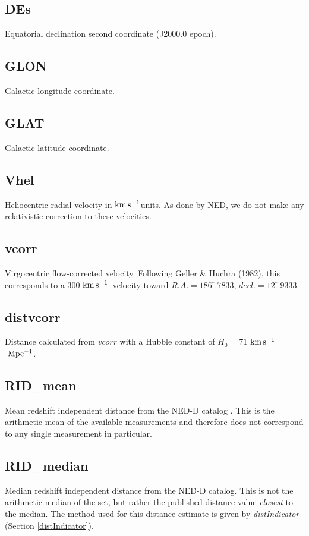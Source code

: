 \documentclass[iop]{emulateapj-rtx4}
\newcommand{\kms}{$\rm km\, s^{-1}$}
\begin{document}
\subsection{DEs}
Equatorial declination second coordinate (J2000.0 epoch).

\subsection{GLON}
Galactic longitude coordinate.

\subsection{GLAT}
Galactic latitude coordinate.

\subsection{Vhel}
Heliocentric radial velocity in \kms units. As done by NED, we do not make any relativistic correction to these velocities.

\subsection{vcorr}
Virgocentric flow-corrected velocity. Following Geller \& Huchra (1982), this corresponds to a 300 \kms~velocity toward $R.A. = 186^{\circ}.7833$, $decl. = 12^{\circ}.9333$.

\subsection{distvcorr}
Distance calculated from $vcorr$ with a Hubble constant of $H_0 = 71$ \kms $~\rm Mpc^{-1}$.

\subsection{RID\_mean}
Mean redshift independent distance from the NED-D catalog \citep{tully2009}. This is the arithmetic mean of the available measurements and therefore does not correspond to any single measurement in particular.

\subsection{RID\_median}
Median redshift independent distance from the NED-D catalog. This is not the arithmetic median of the set, but rather the published distance value \emph{closest} to the median. The method used for this distance estimate is given by \emph{distIndicator} (Section \ref{distIndicator}).
\end{document}
